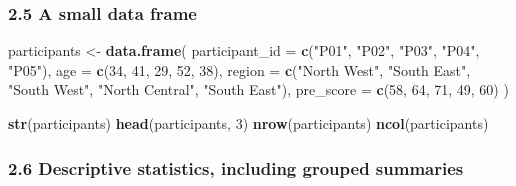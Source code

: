 \documentclass[11pt]{article}
\newenvironment{Shaded}{\begin{snugshade}}{\end{snugshade}}
\newcommand{\AttributeTok}[1]{\textcolor[rgb]{0.13,0.29,0.53}{#1}}
\newcommand{\CommentTok}[1]{\textcolor[rgb]{0.56,0.35,0.01}{\textit{#1}}}
\newcommand{\DecValTok}[1]{\textcolor[rgb]{0.00,0.00,0.81}{#1}}
\newcommand{\FunctionTok}[1]{\textcolor[rgb]{0.13,0.29,0.53}{\textbf{#1}}}
\newcommand{\NormalTok}[1]{#1}
\newcommand{\OtherTok}[1]{\textcolor[rgb]{0.56,0.35,0.01}{#1}}
\newcommand{\SpecialCharTok}[1]{\textcolor[rgb]{0.81,0.36,0.00}{\textbf{#1}}}
\newcommand{\StringTok}[1]{\textcolor[rgb]{0.31,0.60,0.02}{#1}}
\begin{document}
\hypertarget{a-small-data-frame}{%
\subsubsection{2.5 A small data frame}\label{a-small-data-frame}}

\begin{Shaded}
\begin{Highlighting}[]
\NormalTok{participants }\OtherTok{\textless{}{-}} \FunctionTok{data.frame}\NormalTok{(}
  \AttributeTok{participant\_id =} \FunctionTok{c}\NormalTok{(}\StringTok{"P01"}\NormalTok{, }\StringTok{"P02"}\NormalTok{, }\StringTok{"P03"}\NormalTok{, }\StringTok{"P04"}\NormalTok{, }\StringTok{"P05"}\NormalTok{),}
  \AttributeTok{age =} \FunctionTok{c}\NormalTok{(}\DecValTok{34}\NormalTok{, }\DecValTok{41}\NormalTok{, }\DecValTok{29}\NormalTok{, }\DecValTok{52}\NormalTok{, }\DecValTok{38}\NormalTok{),}
  \AttributeTok{region =} \FunctionTok{c}\NormalTok{(}\StringTok{"North West"}\NormalTok{, }\StringTok{"South East"}\NormalTok{, }\StringTok{"South West"}\NormalTok{, }\StringTok{"North Central"}\NormalTok{, }\StringTok{"South East"}\NormalTok{),}
  \AttributeTok{pre\_score =} \FunctionTok{c}\NormalTok{(}\DecValTok{58}\NormalTok{, }\DecValTok{64}\NormalTok{, }\DecValTok{71}\NormalTok{, }\DecValTok{49}\NormalTok{, }\DecValTok{60}\NormalTok{)}
\NormalTok{)}

\FunctionTok{str}\NormalTok{(participants)}
\FunctionTok{head}\NormalTok{(participants, }\DecValTok{3}\NormalTok{)}
\FunctionTok{nrow}\NormalTok{(participants)}
\FunctionTok{ncol}\NormalTok{(participants)}
\end{Highlighting}
\end{Shaded}

\hypertarget{descriptive-statistics-including-grouped-summaries}{%
\subsubsection{2.6 Descriptive statistics, including grouped
summaries}\label{descriptive-statistics-including-grouped-summaries}}

\begin{Shaded}
\end{Shaded}
\end{document}
